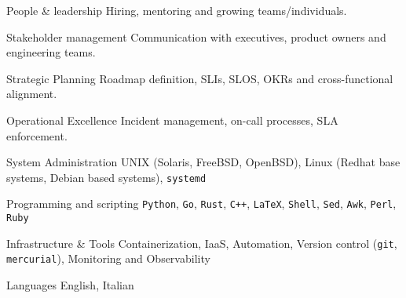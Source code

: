 \begin{cvskills}

  \cvskill
  {People \& leadership} %
  {Hiring, mentoring and growing teams/individuals.}

  \cvskill
  {Stakeholder management} %
  {Communication with executives, product owners and engineering teams.}

  \cvskill
  {Strategic Planning} %
  {Roadmap definition, SLIs, SLOS, OKRs and cross-functional alignment.}

  \cvskill
  {Operational Excellence} %
  {Incident management, on-call processes, SLA enforcement.}

  \cvskill
  {System Administration} %
  {UNIX (Solaris, FreeBSD, OpenBSD), Linux (Redhat base systems, Debian based systems), \texttt{systemd}}

  \cvskill
  {Programming and scripting} %
  {\texttt{Python}, \texttt{Go}, \texttt{Rust}, \texttt{C++}, \texttt{LaTeX}, \texttt{Shell}, \texttt{Sed}, \texttt{Awk}, \texttt{Perl}, \texttt{Ruby}} %

  \cvskill
  {Infrastructure \& Tools} %
  {Containerization, IaaS, Automation, Version control (\texttt{git}, \texttt{mercurial}), Monitoring and Observability}

  \cvskill
  {Languages} %
  {English, Italian} %

\end{cvskills}


